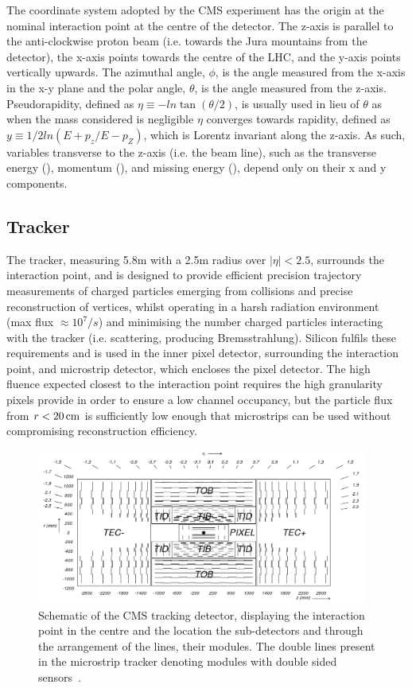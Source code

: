 The coordinate system adopted by the CMS experiment has the origin at the nominal interaction point at the centre of the detector. 
The z-axis is parallel to the anti-clockwise proton beam (i.e. towards the Jura mountains from the detector), the x-axis points towards the centre of the LHC, and the y-axis points vertically upwards.
The azimuthal angle, $\phi$, is the angle measured from the x-axis in the x-y plane and the polar angle, $\theta$, is the angle measured from the z-axis.
Pseudorapidity, defined as $\eta \equiv -ln\tan(\theta/2)$, is usually used in lieu of $\theta$ as when the mass considered is negligible $\eta$ converges towards rapidity, defined as $y \equiv	1/2 ln(E+p_{z}/E-p_{Z})$, which is Lorentz invariant along the z-axis.
As such, variables transverse to the z-axis (i.e. the beam line), such as the transverse energy (\ET), momentum (\pT), and missing energy (\MET), depend only on their x and y components.

\subsection{Tracker}\label{subsec:tracker}
The tracker, measuring 5.8m with a 2.5m radius over $|\eta| < 2.5$, surrounds the interaction point, and is designed to provide efficient precision trajectory measurements of charged particles emerging from collisions and precise reconstruction of vertices, whilst operating in a harsh radiation environment (max flux $\approx 10^{7}/s$) and minimising the number charged particles interacting with the tracker (i.e. scattering, producing Bremsstrahlung).
Silicon fulfils these requirements and is used in the inner pixel detector, surrounding the interaction point, and microstrip detector, which encloses the pixel detector.
The high fluence expected closest to the interaction point requires the high granularity pixels provide in order to ensure a low channel occupancy, but the particle flux from $r < 20\,\text{cm}$ is sufficiently low enough that microstrips can be used without compromising reconstruction efficiency.

\begin{figure}[htbp]
\begin{center}
\includegraphics[width=0.97\textwidth]{figs/cms/fig_cmstracker.png}
\caption{Schematic of the CMS tracking detector, displaying the interaction point in the centre and the location the sub-detectors and through the arrangement of the lines, their modules. The double lines present in the microstrip tracker denoting modules with double sided sensors~\cite{Sprenger:2010ss}.}
\label{fig:tracker}
\end{center}
\end{figure}

